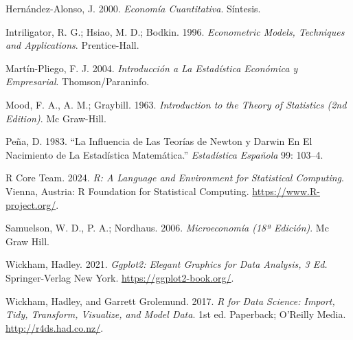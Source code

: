 \documentclass[
]{book}
\newlength{\cslhangindent}
\newenvironment{CSLReferences}[2] %
 {\begin{list}{}{%
  \setlength{\itemindent}{0pt}
  \setlength{\leftmargin}{0pt}
  \setlength{\parsep}{0pt}
  \ifodd #1
   \setlength{\leftmargin}{\cslhangindent}
   \setlength{\itemindent}{-1\cslhangindent}
  \fi
  \setlength{\itemsep}{#2\baselineskip}}}
 {\end{list}}
\begin{document}
\label{refs}
\begin{CSLReferences}{1}{0}
Hernández-Alonso, J. 2000. \emph{Economía Cuantitativa}. Síntesis.

Intriligator, R. G.; Hsiao, M. D.; Bodkin. 1996. \emph{Econometric Models, Techniques and Applications}. Prentice-Hall.

Martín-Pliego, F. J. 2004. \emph{Introducción a La Estadística Económica y Empresarial}. Thomson/Paraninfo.

Mood, F. A., A. M.; Graybill. 1963. \emph{Introduction to the Theory of Statistics (2nd Edition)}. Mc Graw-Hill.

Peña, D. 1983. {``La Influencia de Las Teorías de Newton y Darwin En El Nacimiento de La Estadística Matemática.''} \emph{Estadística Española} 99: 103--4.

R Core Team. 2024. \emph{R: A Language and Environment for Statistical Computing}. Vienna, Austria: R Foundation for Statistical Computing. \url{https://www.R-project.org/}.

Samuelson, W. D., P. A.; Nordhaus. 2006. \emph{Microeconomía (18ª Edición)}. Mc Graw Hill.

Wickham, Hadley. 2021. \emph{Ggplot2: Elegant Graphics for Data Analysis, 3 Ed.} Springer-Verlag New York. \url{https://ggplot2-book.org/}.

Wickham, Hadley, and Garrett Grolemund. 2017. \emph{R for Data Science: Import, Tidy, Transform, Visualize, and Model Data}. 1st ed. Paperback; O'Reilly Media. \url{http://r4ds.had.co.nz/}.

\end{CSLReferences}
\end{document}
